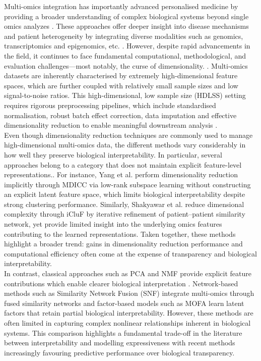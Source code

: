 \documentclass[conference]{IEEEtran}
\begin{document}
Multi-omics integration has importantly advanced personalised medicine by providing a broader understanding of complex biological systems beyond single omics analyzes \cite{acharya_comprehensive_2024}. These approaches offer deeper insight into disease mechanisms and patient heterogeneity by integrating diverse modalities such as genomics, transcriptomics and epigenomics, etc. \cite{hong_multi-omics_2025}. However, despite rapid advancements in the field, it continues to face fundamental computational, methodological, and evaluation challenges—most notably, the curse of dimensionality. \cite{guarino_intrinsic-dimension_2023}. Multi-omics datasets are inherently characterised by extremely high-dimensional feature spaces, which are further coupled with relatively small sample sizes and low signal-to-noise ratios\cite{kioroglou_multi-omic_2025,hong_multi-omics_2025}. This high-dimensional, low sample size (HDLSS) setting requires rigorous preprocessing pipelines, which include standardised normalisation, robust batch effect correction, data imputation and effective dimensionality reduction to enable meaningful downstream analysis \cite{abdelaziz_multi-omics_2024}.\\
Even though dimensionality reduction techniques are commonly used to manage high-dimensional multi-omics data, the different methods vary considerably in how well they preserve biological interpretability. In particular, several approaches belong to a category that does not maintain explicit feature-level representations.\cite{shakyawar_icluf_nodate, hong_multi-omics_2025, yang_mdicc_2022}. For instance, Yang et al. perform dimensionality reduction implicitly through MDICC \cite{yang_mdicc_2022} via low-rank subspace learning without constructing an explicit latent feature space, which limits biological interpretability despite strong clustering performance. Similarly, Shakyawar et al. \cite{shakyawar_icluf_nodate} reduce dimensional complexity through iCluF by iterative refinement of patient–patient similarity network, yet provide limited insight into the underlying omics features contributing to the learned representations. Taken together, these methods highlight a broader trend: gains in dimensionality reduction performance and computational efficiency often come at the expense of transparency and biological interpretability.\\
In contrast, classical approaches such as PCA  and NMF provide explicit feature contributions which enable clearer biological interpretation \cite{downing_primer_nodate}. Network-based methods such as Similarity Network Fusion (SNF)\cite{cantini_benchmarking_2021} integrate multi-omics through fused similarity networks and factor-based models such as MOFA \cite{darkaoui_integrative_2026} learn latent factors that retain partial biological interpretability. However, these methods are often limited in capturing complex nonlinear relationships inherent in biological systems. This comparison highlights a fundamental trade-off in the literature between interpretability and modelling expressiveness with recent methods increasingly favouring predictive performance over biological transparency.\\
\end{document}
